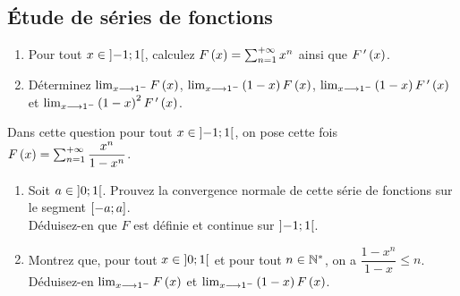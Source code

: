 \subsection*{Étude de séries de fonctions}


\begin{q}
\begin{enumerate}
    \item Pour tout \(x\in\left]-1;1\right[\), calculez \(F\left(x\right)=\sum_{n=1}^{+\infty}x^n\) ainsi que \(F^{\,\prime}\left(x\right)\). \\
    \item Déterminez \(\lim_{x\longrightarrow1^-}F\left(x\right)\), \(\lim_{x\longrightarrow1^-}\left(1-x\right)F\left(x\right)\), \(\lim_{x\longrightarrow1^-}\left(1-x\right)F^{\,\prime}\left(x\right)\) et \(\lim_{x\longrightarrow1^-}\left(1-x\right)^2F^{\,\prime}\left(x\right)\).
\end{enumerate}
\end{q}

\begin{q}
Dans cette question pour tout \(x\in\left]-1;1\right[\), on pose cette fois \(F\left(x\right)=\sum_{n=1}^{+\infty}\dfrac{x^n}{1-x^n}\).

\begin{enumerate}
    \item Soit \(a\in\left]0;1\right[\). Prouvez la convergence normale de cette série de fonctions sur le segment \(\left[-a;a\right]\). \\ Déduisez-en que \(F\) est définie et continue sur \(\left]-1;1\right[\). \\
    \item Montrez que, pour tout \(x\in\left]0;1\right[\) et pour tout \(n\in\mathbb{N}^*\), on a \(\dfrac{1-x^n}{1-x}\leq n\). \\ Déduisez-en \(\lim_{x\longrightarrow1^-}F\left(x\right)\) et \(\lim_{x\longrightarrow1^-}\left(1-x\right)F\left(x\right)\).
\end{enumerate}
\end{q}


